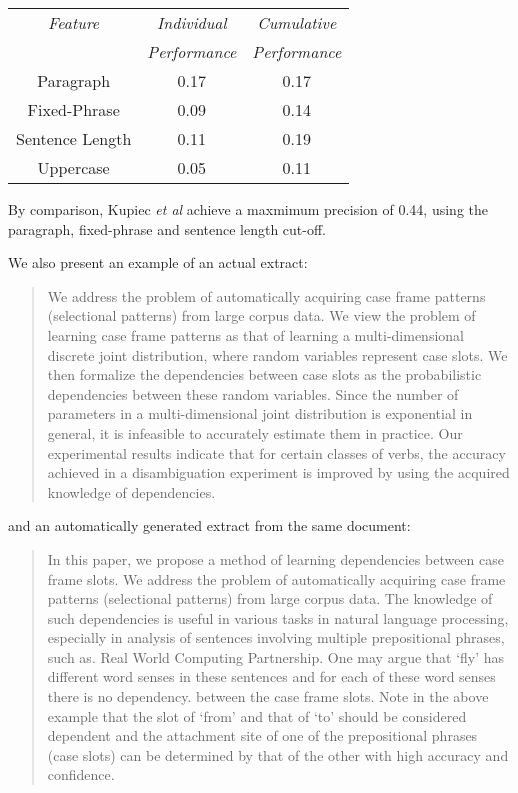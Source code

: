 \documentclass[a4paper, 10pt]{article}
\begin{document}
\begin{table}[ht]
\begin{center}
\begin{tabular}{|c|c|c|}        \hline
{\em Feature} & {\em Individual} & {\em Cumulative}
\\ & {\em Performance} & {\em Performance}
\\ \hline
Paragraph & 0.17 & 0.17
\\
Fixed-Phrase  & 0.09 & 0.14
\\
Sentence Length & 0.11 & 0.19
\\
Uppercase & 0.05 & 0.11
\\
\hline
\end{tabular}
\end{center}
\end{table}

By comparison, Kupiec {\it et al} achieve a maxmimum precision of 0.44, using the paragraph, fixed-phrase and sentence length cut-off.

We also present an example of an actual extract:

\begin{quote}
We address the problem of automatically acquiring case frame patterns (selectional patterns) from large corpus data. We view the problem of learning case frame patterns as that of learning a multi-dimensional discrete joint distribution, where random variables represent case slots. We then formalize the dependencies between case slots as the probabilistic dependencies between these random variables. Since the number of parameters in a multi-dimensional joint distribution is exponential in general, it is infeasible to accurately estimate them in practice. Our experimental results indicate that for certain classes of verbs, the accuracy achieved in a disambiguation experiment is improved by using the acquired knowledge of dependencies.
\end{quote}

and an automatically generated extract from the same document:
\begin{quote}
In this paper, we propose a method of learning dependencies between case frame slots. We address the problem of automatically acquiring case frame patterns (selectional patterns) from large corpus data. The knowledge of such dependencies is useful in various tasks in natural language processing, especially in analysis of sentences involving multiple prepositional phrases, such as.  Real World Computing Partnership. One may argue that `fly' has different word senses in these sentences and for each of these word senses there is no dependency. between the case frame slots. Note in the above example that the slot of `from' and that of `to' should be considered dependent and the attachment site of one of the prepositional phrases (case slots) can be determined by that of the other with high accuracy and confidence.
\end{quote}
\end{document}
